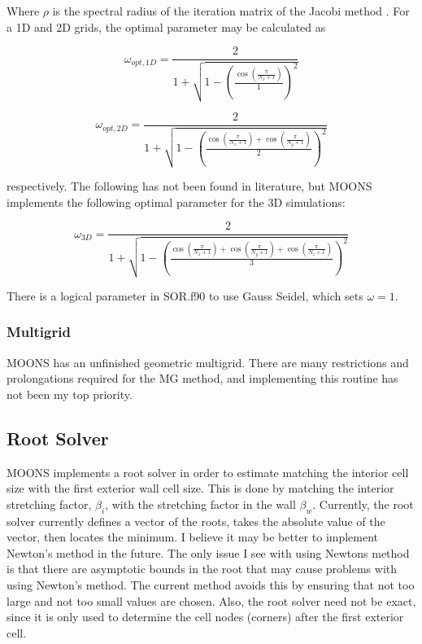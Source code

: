 \documentclass[11pt]{article}
\begin{document}
Where $\rho$ is the spectral radius of the iteration matrix of the Jacobi method \cite{Yang2009}. For a 1D and 2D grids, the optimal parameter may be calculated as \cite{Mcdonough2008}

\begin{equation}
\omega_{opt,1D} = \frac{2}{1 + \sqrt{1 - \left( \frac{\cos\left(\frac{\pi}{N_x+1} \right)}{1} \right)^2}}
\end{equation}

\begin{equation}
\omega_{opt,2D} = \frac{2}{1 + \sqrt{1 - \left( \frac{\cos\left(\frac{\pi}{N_x+1} \right) + \cos\left(\frac{\pi}{N_y+1} \right)}{2} \right)^2}}
\end{equation}

respectively. The following has not been found in literature, but MOONS implements the following optimal parameter for the 3D simulations:

\begin{equation}
\omega_{3D} = \frac{2}{1 + \sqrt{1 - \left( \frac{\cos\left(\frac{\pi}{N_x+1} \right) + \cos\left(\frac{\pi}{N_y+1} \right)+ \cos\left(\frac{\pi}{N_z+1} \right)}{3} \right)^2}}
\end{equation}

There is a logical parameter in SOR.f90 to use Gauss Seidel, which sets $\omega=1$.

\subsubsection{Multigrid}
MOONS has an unfinished geometric multigrid. There are many restrictions and prolongations required for the MG method, and implementing this routine has not been my top priority.

\subsection{Root Solver}
MOONS implements a root solver in order to estimate matching the interior cell size with the first exterior wall cell size. This is done by matching the interior stretching factor, $\beta_i$, with the stretching factor in the wall $\beta_w$. Currently, the root solver currently defines a vector of the roots, takes the absolute value of the vector, then locates the minimum. I believe it may be better to implement Newton's method in the future. The only issue I see with using Newtons method is that there are asymptotic bounds in the root that may cause problems with using Newton's method. The current method avoids this by ensuring that not too large and not too small values are chosen. Also, the root solver need not be exact, since it is only used to determine the cell nodes (corners) after the first exterior cell.
\end{document}
